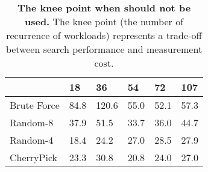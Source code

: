 \begin{table}[!htbp]
\centering
\caption{\textbf{The knee point when \micky should not be used.} 
The knee point (the number of recurrence of workloads) represents a trade-off between search performance and measurement cost.
}
\label{table:break_even_cost}
\begin{tabular}{@{}llllll@{}}
\toprule
            & 18   & 36    & 54   & 72   & 107  \\ \midrule
Brute Force & 84.8 & 120.6 & 55.0 & 52.1 & 57.3 \\
Random-8    & 37.9 & 51.5  & 33.7 & 36.0 & 44.7 \\
Random-4    & 18.4 & 24.2  & 27.0 & 28.5 & 27.9 \\
CherryPick  & 23.3 & 30.8  & 20.8 & 24.0 & 27.0 \\ \bottomrule
\end{tabular}
\end{table}